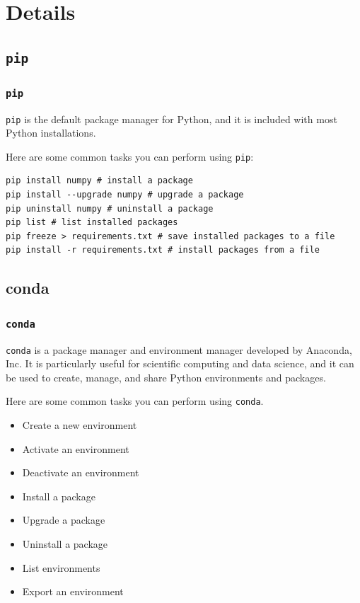 \documentclass{beamer}
\begin{document}
\section{Details}

\subsection{\texttt{pip}}

\begin{frame}[fragile]
  \frametitle{\texttt{pip}}
  \texttt{pip} is the default package manager for Python, and it is included with most Python installations.

  Here are some common tasks you can perform using \texttt{pip}:

  \begin{lstlisting}
pip install numpy # install a package 
pip install --upgrade numpy # upgrade a package
pip uninstall numpy # uninstall a package
pip list # list installed packages
pip freeze > requirements.txt # save installed packages to a file
pip install -r requirements.txt # install packages from a file
\end{lstlisting}

\end{frame}

\subsection{conda}

\begin{frame}
  \frametitle{\texttt{conda}}

  \texttt{conda} is a package manager and environment manager developed by Anaconda, Inc. It is particularly useful for scientific computing and data science, and it can be used to create, manage, and share Python environments and packages.

  Here are some common tasks you can perform using \texttt{conda}.
  \begin{itemize}
    \item Create a new environment
    \item Activate an environment
    \item Deactivate an environment
    \item Install a package
    \item Upgrade a package
    \item Uninstall a package
    \item List environments
    \item Export an environment
  \end{itemize}

\end{frame}
\end{document}
